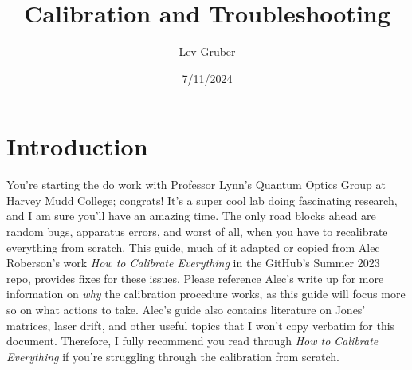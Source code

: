 \documentclass{paper}[11pt]
\title{Calibration and Troubleshooting}
\author{Lev Gruber}
\date{7/11/2024}
\begin{document}
\maketitle 

\tableofcontents
\newpage
\section{Introduction}
You're starting the do work with Professor Lynn's Quantum Optics Group at Harvey Mudd College; congrats! It's a super cool lab doing fascinating research, and I am sure you'll have an amazing time. The only road blocks ahead are random bugs, apparatus errors, and worst of all, when you have to recalibrate everything from scratch. This guide, much of it adapted or copied from Alec Roberson's work \textit{How to Calibrate Everything} in the GitHub's Summer 2023 repo, provides fixes for these issues. Please reference Alec's write up for more information on \textit{why} the calibration procedure works, as this guide will focus more so on what actions to take. Alec's guide also contains literature on Jones' matrices, laser drift, and other useful topics that I won't copy verbatim for this document. Therefore, I fully recommend you read through 
\textit{How to Calibrate Everything} if you're struggling through the calibration from scratch.
\end{document}
